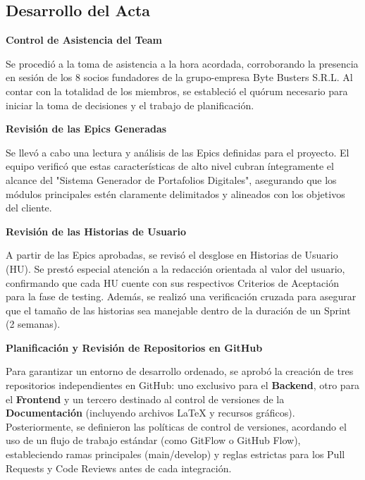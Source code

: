 \newpage
\subsection{Desarrollo del Acta}

\noindent \textbf{Control de Asistencia del Team}\par
Se procedió a la toma de asistencia a la hora acordada, corroborando la presencia en sesión de los 8 socios fundadores de la grupo-empresa Byte Busters S.R.L. Al contar con la totalidad de los miembros, se estableció el quórum necesario para iniciar la toma de decisiones y el trabajo de planificación.

\vspace*{0.5cm}
\noindent\textbf{Revisión de las Epics Generadas}\par
Se llevó a cabo una lectura y análisis de las Epics definidas para el proyecto. El equipo verificó que estas características de alto nivel cubran íntegramente el alcance del "Sistema Generador de Portafolios Digitales", asegurando que los módulos principales estén claramente delimitados y alineados con los objetivos del cliente.

\vspace*{0.5cm}
\noindent \textbf{Revisión de las Historias de Usuario}\par
A partir de las Epics aprobadas, se revisó el desglose en Historias de Usuario (HU). Se prestó especial atención a la redacción orientada al valor del usuario, confirmando que cada HU cuente con sus respectivos Criterios de Aceptación para la fase de testing. Además, se realizó una verificación cruzada para asegurar que el tamaño de las historias sea manejable dentro de la duración de un Sprint (2 semanas).

\vspace*{0.5cm}
\noindent \textbf{Planificación y Revisión de Repositorios en GitHub}\par
Para garantizar un entorno de desarrollo ordenado, se aprobó la creación de tres repositorios independientes en GitHub: uno exclusivo para el \textbf{Backend}, otro para el \textbf{Frontend} y un tercero destinado al control de versiones de la \textbf{Documentación} (incluyendo archivos LaTeX y recursos gráficos). Posteriormente, se definieron las políticas de control de versiones, acordando el uso de un flujo de trabajo estándar (como GitFlow o GitHub Flow), estableciendo ramas principales (main/develop) y reglas estrictas para los Pull Requests y Code Reviews antes de cada integración.


